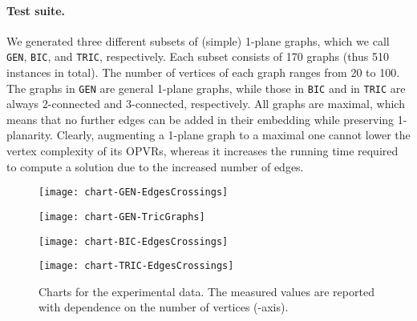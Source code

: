 \documentclass{article}
\newcommand{\opvr}{OPVR\xspace}
\begin{document}
\paragraph{Test suite.}
We generated three different subsets of (simple) 1-plane graphs, which we call {\tt GEN}, {\tt BIC}, and {\tt TRIC}, respectively. Each subset consists of 170 graphs (thus 510 instances in total). The number of vertices of each graph ranges from 20 to 100. The graphs in {\tt GEN} are general 1-plane graphs, while those in {\tt BIC} and in {\tt TRIC} are always 2-connected and 3-connected, respectively. All graphs are maximal, which means that no further edges can be added in their embedding while preserving 1-planarity. Clearly, augmenting a 1-plane graph to a maximal one cannot lower the vertex complexity of its {\opvr}s, whereas it increases the running time required to compute a solution due to the increased number of edges. 

 \begin{figure}[t]
    \centering
    \begin{minipage}[b]{.49\textwidth}
    	\centering
    	\texttt{[image: chart-GEN-EdgesCrossings]}
    	\label{ch:chart-GEN-EdgesCrossings}
    \end{minipage}
    \begin{minipage}[b]{.49\textwidth}
    	\centering
    	\texttt{[image: chart-GEN-TricGraphs]}
    	\label{ch:chart-GEN-TricGraphs}
    \end{minipage}
    \begin{minipage}[b]{.49\textwidth}
    	\centering
    	\texttt{[image: chart-BIC-EdgesCrossings]}
    	\label{ch:chart-BIC-EdgesCrossings}
    \end{minipage}   
    \begin{minipage}[b]{.49\textwidth}
    	\centering
    	\texttt{[image: chart-TRIC-EdgesCrossings]}
    	\label{ch:chart-TRIC-EdgesCrossings}
    \end{minipage}  
    \caption{Charts for the experimental data. The measured values are reported with dependence on the number of vertices (-axis).}\label{ch:additional}
\end{figure} 
\end{document}
